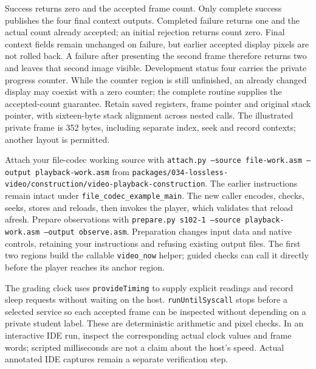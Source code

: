 Success returns zero and the accepted frame count. Only complete success publishes
the four final context outputs. Completed failure returns one and the actual count
already accepted; an initial rejection returns count zero. Final context fields
remain unchanged on failure, but earlier accepted display pixels are not rolled
back. A failure after presenting the second frame therefore returns two and leaves
that second image visible. Development status four carries the private progress counter. While the counter
region is still unfinished, an already changed display may coexist with a zero
counter; the complete routine supplies the accepted-count guarantee.
Retain saved registers, frame pointer and original stack pointer, with sixteen-byte
stack alignment across nested calls. The illustrated private frame is 352 bytes,
including separate index, seek and record contexts; another layout is permitted.

Attach your file-codec working source with \texttt{attach.py --source file-work.asm
  --output playback-work.asm} from \texttt{packages/034-lossless-video/construction/video-playback-construction}.
The earlier instructions remain intact under \texttt{file\_codec\_example\_main}.
The new caller encodes, checks, seeks, stores and reloads, then invokes the player,
which validates that reload afresh. Prepare observations with \texttt{prepare.py
  s102-1 --source playback-work.asm --output observe.asm}. Preparation changes input
data and native controls, retaining your instructions and refusing existing output
files. The first two regions build the callable \texttt{video\_now} helper; guided
checks can call it directly before the player reaches its anchor region.

The grading clock uses \texttt{provideTiming} to supply explicit readings and record
sleep requests without waiting on the host. \texttt{runUntilSyscall} stops before
a selected service so each accepted frame can be inspected without depending on a
private student label. These are deterministic arithmetic and pixel checks. In an
interactive IDE run, inspect the corresponding actual clock values and frame words;
scripted milliseconds are not a claim about the host's speed. Actual annotated IDE
captures remain a separate verification step.
